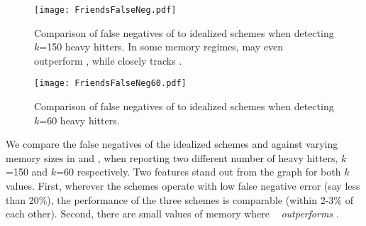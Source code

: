 
\begin{figure}[h]
\texttt{[image: FriendsFalseNeg.pdf]}
\caption{Comparison of false negatives of \TheSystem to idealized schemes when
  detecting $k$=150 heavy hitters. In some memory regimes, \TheSystem may
  even outperform \spacesaving, while \Baseline closely tracks \spacesaving.}
\label{fig:FalseNegvsFriendSchemes-k150}
\end{figure}


\begin{figure}[h]
\texttt{[image: FriendsFalseNeg60.pdf]}
\caption{Comparison of false negatives of \TheSystem to idealized schemes when
  detecting $k$=60 heavy hitters.}
\label{fig:FalseNegvsFriendSchemes-k60}
\end{figure}

 We compare the false
negatives of the idealized schemes and \TheSystem against varying memory sizes
in  and ,
when reporting two different number of heavy hitters, $k$=150 and $k$=60
respectively. Two features stand out from the graph for both $k$ values. First,
wherever the schemes operate with low false negative error (say less than 20\%),
the performance of the three schemes is comparable (\ie within 2-3\% of each
other). Second, there are small values of memory where \TheSystem\ {\em
  outperforms} \spacesaving.


